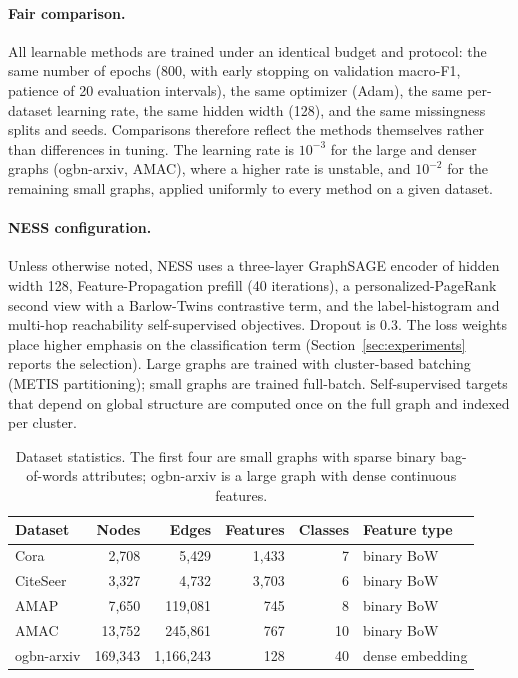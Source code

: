 \paragraph{Fair comparison.} All learnable methods are trained under an identical budget and protocol: the same number of epochs (800, with early stopping on validation macro-F1, patience of 20 evaluation intervals), the same optimizer (Adam), the same per-dataset learning rate, the same hidden width (128), and the same missingness splits and seeds. Comparisons therefore reflect the methods themselves rather than differences in tuning. The learning rate is $10^{-3}$ for the large and denser graphs (ogbn-arxiv, AMAC), where a higher rate is unstable, and $10^{-2}$ for the remaining small graphs, applied uniformly to every method on a given dataset.

\paragraph{NESS configuration.} Unless otherwise noted, NESS uses a three-layer GraphSAGE encoder of hidden width 128, Feature-Propagation prefill (40 iterations), a personalized-PageRank second view with a Barlow-Twins contrastive term, and the label-histogram and multi-hop reachability self-supervised objectives. Dropout is 0.3. The loss weights place higher emphasis on the classification term (Section~\ref{sec:experiments} reports the selection). Large graphs are trained with cluster-based batching (METIS partitioning); small graphs are trained full-batch. Self-supervised targets that depend on global structure are computed once on the full graph and indexed per cluster.

\begin{table}[t]
\centering
\caption{Dataset statistics. The first four are small graphs with sparse binary bag-of-words attributes; ogbn-arxiv is a large graph with dense continuous features.}
\label{tab:datasets}
\small
\begin{tabular}{@{}lrrrrl@{}}
\toprule
\textbf{Dataset} & \textbf{Nodes} & \textbf{Edges} & \textbf{Features} & \textbf{Classes} & \textbf{Feature type} \\
\midrule
Cora        & 2{,}708     & 5{,}429       & 1{,}433 & 7 & binary BoW \\
CiteSeer    & 3{,}327     & 4{,}732       & 3{,}703 & 6 & binary BoW \\
AMAP        & 7{,}650     & 119{,}081     & 745     & 8 & binary BoW \\
AMAC        & 13{,}752    & 245{,}861     & 767     & 10 & binary BoW \\
ogbn-arxiv  & 169{,}343   & 1{,}166{,}243 & 128     & 40 & dense embedding \\
\bottomrule
\end{tabular}
\end{table}
